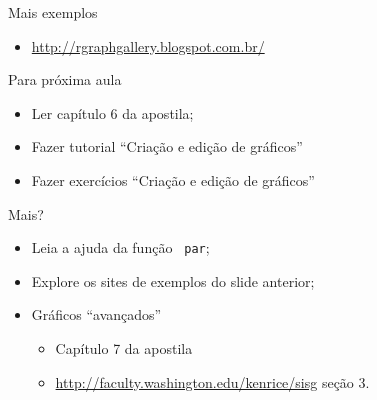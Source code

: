 \documentclass{beamer}
\begin{document}
\begin{frame}{Mais exemplos}
  \begin{itemize}
  \item \url{http://rgraphgallery.blogspot.com.br/}
  \end{itemize}

  
\end{frame}

\begin{frame}{Para próxima aula}

  \begin{itemize}
  \item Ler capítulo 6 da apostila;
  \item Fazer tutorial ``Criação e edição de gráficos''
  \item Fazer exercícios ``Criação e edição de gráficos''
  \end{itemize} \pause
Mais?

\begin{itemize}
\item Leia a ajuda da função \texttt{ par};
\item Explore os sites de exemplos do slide anterior;
\item Gráficos ``avançados''
  \begin{itemize}
  \item Capítulo 7 da apostila
  \item \url{http://faculty.washington.edu/kenrice/sisg} seção 3. 
  \end{itemize}

\end{itemize}
\end{frame}
\end{document}
